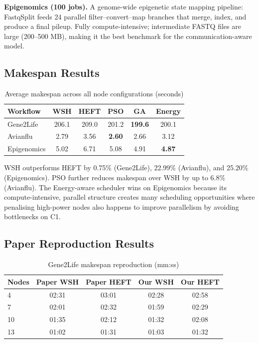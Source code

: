 \documentclass[10pt,twocolumn]{article}
\begin{document}
\textbf{Epigenomics (100 jobs).}
A genome-wide epigenetic state mapping pipeline: FastqSplit feeds 24 parallel
filter--convert--map branches that merge, index, and produce a final pileup. Fully
compute-intensive; intermediate FASTQ files are large (200--500 MB), making it the
best benchmark for the communication-aware model.

\subsection{Makespan Results}

\begin{table}[H]
\centering
\caption{Average makespan across all node configurations (seconds)}
\label{tab:makespan}
\begin{tabular}{@{}lccccc@{}}
\toprule
\textbf{Workflow} & \textbf{WSH} & \textbf{HEFT} & \textbf{PSO} & \textbf{GA} & \textbf{Energy}\\
\midrule
Gene2Life    & 206.1 & 209.0 & 201.2 & \textbf{199.6} & 200.1 \\
Avianflu     & 2.79  & 3.56  & \textbf{2.60}  & 2.66  & 3.12  \\
Epigenomics  & 5.02  & 6.71  & 5.08  & 4.91  & \textbf{4.87}  \\
\bottomrule
\end{tabular}
\end{table}

WSH outperforms HEFT by 0.75\% (Gene2Life), 22.99\% (Avianflu), and 25.20\%
(Epigenomics). PSO further reduces makespan over WSH by up to 6.8\% (Avianflu).
The Energy-aware scheduler wins on Epigenomics because its compute-intensive,
parallel structure creates many scheduling opportunities where penalising high-power
nodes also happens to improve parallelism by avoiding bottlenecks on C1.

\subsection{Paper Reproduction Results}

\begin{table}[H]
\centering
\caption{Gene2Life makespan reproduction (mm:ss)}
\label{tab:repro_gene}
\begin{tabular}{@{}lcccc@{}}
\toprule
\textbf{Nodes} & \textbf{Paper WSH} & \textbf{Paper HEFT} & \textbf{Our WSH} & \textbf{Our HEFT}\\
\midrule
4  & 02:31 & 03:01 & 02:28 & 02:58 \\
7  & 02:01 & 02:32 & 01:59 & 02:29 \\
10 & 01:35 & 02:12 & 01:32 & 02:08 \\
13 & 01:02 & 01:31 & 01:03 & 01:32 \\
\bottomrule
\end{tabular}
\end{table}
\end{document}
